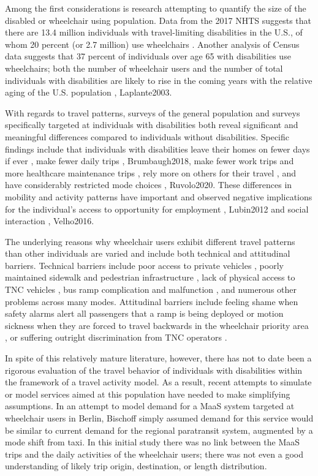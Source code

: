 \documentclass[3p, authoryear, review]{elsarticle} %
\begin{document}
Among the first considerations is research attempting to quantify the size
of the disabled or wheelchair using population. Data from the 2017 NHTS
suggests that there are 13.4 million individuals with travel-limiting disabilities
in the U.S., of whom 20 percent (or 2.7 million) use wheelchairs \citet{Brumbaugh2018}.
Another analysis of Census data suggests that 37 percent of individuals over
age 65 with disabilities use wheelchairs; both the number of wheelchair users
and the number of total individuals with disabilities are likely to rise
in the coming years with the relative aging of the U.S. population \citet{Sweeney2004}, Laplante2003.

With regards to travel patterns, surveys of the general population and surveys
specifically targeted at individuals with disabilities both reveal significant and
meaningful differences compared to individuals without disabilities. Specific
findings include that individuals with disabilities leave their homes on fewer
days if ever \citet{Sweeney2004}, make fewer daily trips
\citet{Schmocker2005}, Brumbaugh2018, make fewer work trips and more
healthcare maintenance trips \citet{Ermagun2016}, rely more on others for their travel \citet{Sweeney2004},
and have considerably restricted mode
choices \citet{Rosenbloom2007}, Ruvolo2020. These differences in mobility and activity patterns
have important and observed negative implications for the individual's access to
opportunity for employment \citet{Rosenbloom2007}, Lubin2012 and social interaction
\citet{Bascom2017}, Velho2016.

The underlying reasons why wheelchair users exhibit different travel patterns
than other individuals are varied and include both technical and attitudinal
barriers. Technical barriers include poor access to private vehicles
\citet{VanRoosmalen2010}, poorly maintained sidewalk and pedestrian infrastructure
\citet{frackelton2013measuring}, lack of physical access to TNC
vehicles \citet{Ruvolo2020}, bus ramp complication and malfunction \citet{Velho2016},
and numerous other problems across many modes.
Attitudinal barriers include feeling shame when safety alarms alert all
passengers that a ramp is being deployed or motion sickness when they are forced
to travel backwards in the wheelchair priority area \citet{Velho2016}, or
suffering outright discrimination from TNC operators \citet{Bascom2017}.

In spite of this relatively mature literature, however, there has not to
date been a rigorous evaluation of the travel behavior of individuals with
disabilities within the framework of a travel activity model. As a result,
recent attempts to simulate or model services aimed at this population have
needed to make simplifying assumptions. In an attempt to model demand for a MaaS
system targeted at wheelchair users in
Berlin, Bischoff \citet{Bischoff2019} simply assumed demand for this service
would be similar to current demand for the regional paratransit system, augmented
by a mode shift from taxi. In this initial study there was no link between the
MaaS trips and the daily activities of the wheelchair users; there was not even a
good understanding of likely trip origin, destination, or length distribution.
\end{document}
